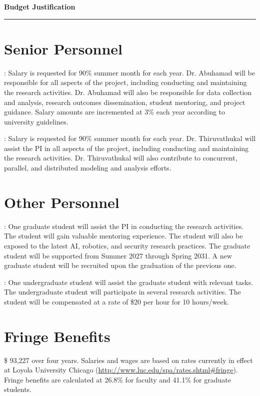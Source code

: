 \setcounter{section}{0}

{\Large\bfseries\filcenter
Budget Justification
\\\rule{\textwidth}{0.4pt}}


\section*{Senior Personnel}
: Salary is requested for 90\% summer month for each year. Dr. Abuhamad will be responsible for all aspects of the project, including conducting and maintaining the research activities. 
Dr. Abuhamad will also be responsible for data collection and analysis, research outcomes dissemination, student mentoring, and project guidance.
Salary amounts are incremented at 3\% each year according to university guidelines.


: Salary is requested for 90\% summer month for each year. Dr. Thiruvathukal will assist the PI in all aspects of the project, including conducting and maintaining the research activities. Dr. Thiruvathukal will also contribute to concurrent, parallel, and distributed modeling and analysis efforts.


\section*{Other Personnel}


: One graduate student will assist the PI in conducting the research activities.
The student will gain valuable mentoring experience. 
The student will also be exposed to the latest AI, robotics, and security research practices. 
The graduate student will be supported from Summer 2027 through Spring 2031. 
A new graduate student will be recruited upon the graduation of the previous one. 


: One undergraduate student will assist the graduate student with relevant tasks. 
The undergraduate student will participate in several research activities.
The student will be compensated at a rate of \$20 per hour for 10 hours/week.





\section*{Fringe Benefits}
\$   93,227 over four years. Salaries and wages are based on rates currently in effect at Loyola University Chicago (\url{http://www.luc.edu/spa/rates.shtml#fringe}).  Fringe benefits are calculated at 26.8\% for faculty and 41.1\% for graduate students.

